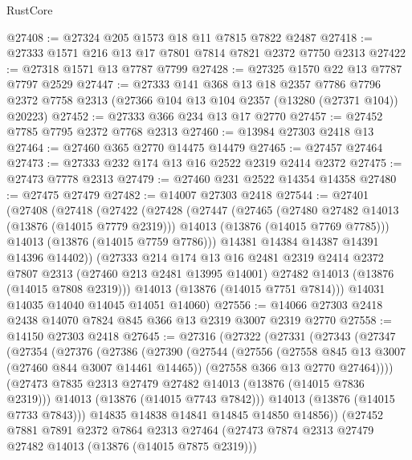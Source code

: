 \begin{lexlean}{RustCore}
\begin{coremodule}
@27408 := @27324 @205 @1573 @18 @11 @7815 @7822 @2487
@27418 := @27333 @1571 @216 @13 @17 @7801 @7814 @7821 @2372 @7750 @2313
@27422 := @27318 @1571 @13 @7787 @7799
@27428 := @27325 @1570 @22 @13 @7787 @7797 @2529
@27447 := @27333
    @141
    @368
    @13
    @18
    @2357
    @7786
    @7796
    @2372
    @7758
    @2313
    (@27366 @104 @13 @104 @2357 (@13280 (@27371 @104)) @20223)
@27452 := @27333 @366 @234 @13 @17 @2770
@27457 := @27452 @7785 @7795 @2372 @7768 @2313
@27460 := @13984 @27303 @2418 @13
@27464 := @27460 @365 @2770 @14475 @14479
@27465 := @27457 @27464
@27473 := @27333 @232 @174 @13 @16 @2522 @2319 @2414 @2372
@27475 := @27473 @7778 @2313
@27479 := @27460 @231 @2522 @14354 @14358
@27480 := @27475 @27479
@27482 := @14007 @27303 @2418
@27544 := @27401
    (@27408
      (@27418
        (@27422
          (@27428
            (@27447
              (@27465
                (@27480 @27482 @14013 (@13876 (@14015 @7779 @2319)))
                @14013
                (@13876 (@14015 @7769 @7785)))
              @14013
              (@13876 (@14015 @7759 @7786)))
            @14381
            @14384
            @14387
            @14391
            @14396
            @14402))
        (@27333
          @214
          @174
          @13
          @16
          @2481
          @2319
          @2414
          @2372
          @7807
          @2313
          (@27460 @213 @2481 @13995 @14001)
          @27482
          @14013
          (@13876 (@14015 @7808 @2319)))
        @14013
        (@13876 (@14015 @7751 @7814)))
      @14031
      @14035
      @14040
      @14045
      @14051
      @14060)
@27556 := @14066 @27303 @2418 @2438 @14070 @7824 @845 @366 @13 @2319 @3007 @2319 @2770
@27558 := @14150 @27303 @2418
@27645 := @27316
    (@27322
      (@27331
        (@27343
          (@27347
            (@27354
              (@27376
                (@27386
                  (@27390
                    (@27544
                      (@27556
                        (@27558 @845 @13 @3007 (@27460 @844 @3007 @14461 @14465))
                        (@27558 @366 @13 @2770 @27464))))
                  (@27473 @7835 @2313 @27479 @27482 @14013 (@13876 (@14015 @7836 @2319)))
                  @14013
                  (@13876 (@14015 @7743 @7842)))
                @14013
                (@13876 (@14015 @7733 @7843)))
              @14835
              @14838
              @14841
              @14845
              @14850
              @14856))
          (@27452
            @7881
            @7891
            @2372
            @7864
            @2313
            @27464
            (@27473 @7874 @2313 @27479 @27482 @14013 (@13876 (@14015 @7875 @2319)))

\end{coremodule}
\end{lexlean}

